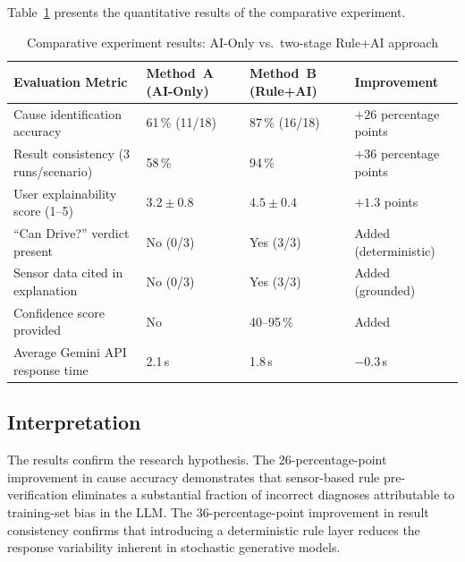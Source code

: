 Table~\ref{tab:experiment} presents the quantitative results of the comparative experiment.

\begin{table}[!htbp]
\centering
\caption{Comparative experiment results: AI-Only vs.\ two-stage Rule+AI approach}
\label{tab:experiment}
\begin{tabularx}{0.98\linewidth}{p{4.8cm} p{2.6cm} p{2.6cm} X}
\toprule
\rowcolor{tblhdr}
\color{white}\textbf{Evaluation Metric} &
\color{white}\textbf{Method~A (AI-Only)} &
\color{white}\textbf{Method~B (Rule+AI)} &
\color{white}\textbf{Improvement} \\
\midrule
Cause identification accuracy       & 61\,\% (11/18) & 87\,\% (16/18) & $+26$ percentage points \\
Result consistency (3 runs/scenario) & 58\,\%         & 94\,\%         & $+36$ percentage points \\
User explainability score (1--5)     & $3.2 \pm 0.8$  & $4.5 \pm 0.4$  & $+1.3$ points \\
``Can Drive?'' verdict present       & No (0/3)       & Yes (3/3)      & Added (deterministic) \\
Sensor data cited in explanation     & No (0/3)       & Yes (3/3)      & Added (grounded) \\
Confidence score provided            & No             & 40--95\,\%     & Added \\
Average Gemini API response time     & 2.1\,s         & 1.8\,s         & $-0.3$\,s \\
\bottomrule
\end{tabularx}
\end{table}


\subsection{Interpretation}

The results confirm the research hypothesis.
The 26-percentage-point improvement in cause accuracy demonstrates that sensor-based rule pre-verification eliminates a substantial fraction of incorrect diagnoses attributable to training-set bias in the LLM.
The 36-percentage-point improvement in result consistency confirms that introducing a deterministic rule layer reduces the response variability inherent in stochastic generative models.

